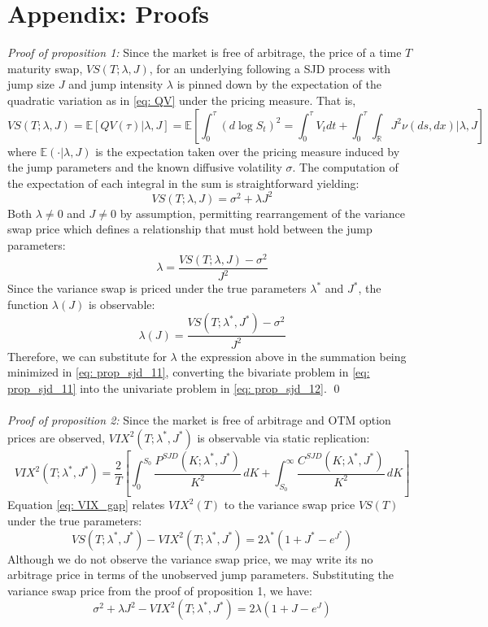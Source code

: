 \documentclass[12pt]{article}
\begin{document}
\section{Appendix: Proofs}
\textit{Proof of proposition 1: } Since the market is free of arbitrage, the price of a time $T$ maturity swap, $VS(T; \lambda, J)$, for an underlying following a SJD process with jump size $J$ and jump intensity $\lambda$ is pinned down by the expectation of the quadratic variation as in \eqref{eq: QV} under the pricing measure. That is,
$$VS(T; \lambda, J) = \mathbb{E}\left[QV(\tau)\vert \lambda, J\right] = \mathbb{E}\left[ \int_0^{\tau} \left(d\log S_t\right)^2 =   \int_0^{\tau}  V_t d t + \int_0^{\tau}  \int_{\mathbb{R}} J^2 \nu(d s, d x)\Big\vert \lambda, J\right]$$
where $\mathbb{E}(\cdot\vert \lambda, J)$ is the expectation taken over the pricing measure induced by the jump parameters and the known diffusive volatility $\sigma$. The computation of the expectation of each integral in the sum is straightforward yielding:
$$VS(T; \lambda, J) =  \sigma^2  + \lambda J^2$$
Both $\lambda \neq 0$ and $J\neq 0$ by assumption, permitting rearrangement of the variance swap price which defines a relationship that must hold between the jump parameters:
$$\lambda =  \dfrac{ VS(T; \lambda, J) - \sigma^2}{J^2} $$
Since the variance swap is priced under the true parameters $\lambda^*$ and $J^*$, the function $\lambda(J)$ is observable:
$$\lambda(J) =  \dfrac{VS(T; \lambda^*, J^*) - \sigma^2}{J^2}$$
Therefore, we can substitute for $\lambda$ the expression above in the summation being minimized in \eqref{eq: prop_sjd_11}, converting the bivariate problem in \eqref{eq: prop_sjd_11} into the univariate problem in \eqref{eq: prop_sjd_12}. \qed \\
\\
\textit{Proof of proposition 2: } Since the market is free of arbitrage and OTM option prices are observed, $VIX^2(T; \lambda^*, J^*)$ is observable via static replication:
$$   VIX^2(T; \lambda^*, J^*) = \dfrac{2}{T}\left[\int_0^{S_0} \dfrac{P^{SJD}(K; \lambda^*, J^*)}{K^2} \, dK +  \int_{S_0}^\infty \dfrac{C^{SJD}(K; \lambda^*,J^*)}{K^2}  \, dK \right]$$
Equation \eqref{eq: VIX_gap} relates $VIX^2(T)$ to the variance swap price $VS(T)$ under the true parameters: 
$$ VS(T; \lambda^*, J^*) - VIX^2(T; \lambda^*, J^*)  = 2\lambda^*(1 + J^* - e^{J^*}) $$
Although we do not observe the variance swap price, we may write its no arbitrage price in terms of the unobserved jump parameters. Substituting the variance swap price from the proof of proposition 1, we have:
$$ \sigma^2 + \lambda J^2 - VIX^2(T; \lambda^*, J^*) = 2\lambda(1 + J - e^{J})$$
\end{document}
